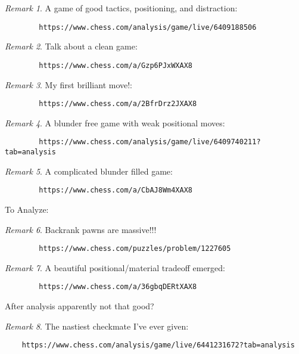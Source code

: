 \documentclass[11pt]{article}
\theoremstyle{remark}
\newtheorem{remark}{Remark}
\begin{document}
\begin{remark}
	A game of good tactics, positioning, and distraction: 
	\begin{verbatim}
		https://www.chess.com/analysis/game/live/6409188506
	\end{verbatim}
\end{remark}

\begin{remark}
	Talk about a clean game:
	\begin{verbatim}
		https://www.chess.com/a/Gzp6PJxWXAX8
	\end{verbatim}
\end{remark}

\begin{remark}
	My first brilliant move!:
	\begin{verbatim}
		https://www.chess.com/a/2BfrDrz2JXAX8
	\end{verbatim}
\end{remark}

\begin{remark}
	A blunder free game with weak positional moves:
	\begin{verbatim}
		https://www.chess.com/analysis/game/live/6409740211?tab=analysis
	\end{verbatim}
\end{remark}

\begin{remark}
	A complicated blunder filled game:
	\begin{verbatim}
		https://www.chess.com/a/CbAJ8Wm4XAX8
	\end{verbatim}	

	To Analyze:
\end{remark}

\begin{remark}
	Backrank pawns are massive!!! 
	\begin{verbatim}
		https://www.chess.com/puzzles/problem/1227605
	\end{verbatim}
\end{remark}

\begin{remark}
	A beautiful positional/material tradeoff emerged:
	\begin{verbatim}
		https://www.chess.com/a/36gbqDERtXAX8
	\end{verbatim}

	After analysis apparently not that good?
\end{remark}

\begin{remark}
	The nastiest checkmate I've ever given:
	\begin{verbatim}
	https://www.chess.com/analysis/game/live/6441231672?tab=analysis
	\end{verbatim}
\end{remark}
\end{document}
